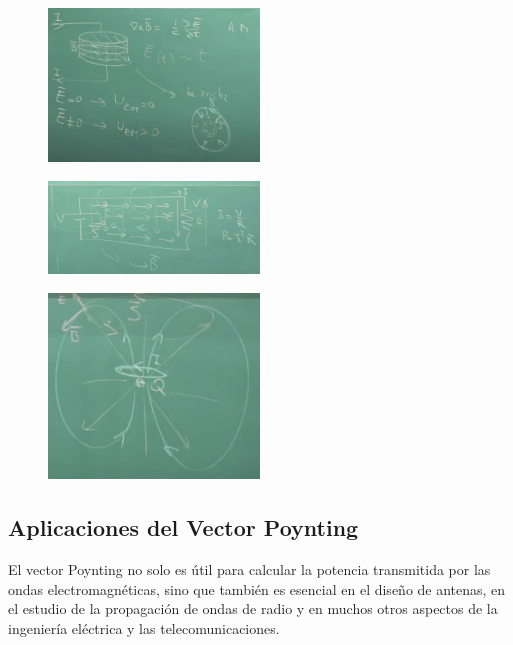 \documentclass{article}
\begin{document}
	\begin{figure}[h!]
		\centering
		\includegraphics[width=0.5\textwidth]{imagen3.jpg}
		\label{fig:mi_imagen4}
	\end{figure}
	\begin{figure}[h!]
		\centering
		\includegraphics[width=0.5\textwidth]{imagen4.jpg}
		\label{fig:mi_imagen5}
	\end{figure}
	\begin{figure}[h!]
		\centering
		\includegraphics[width=0.5\textwidth]{imagen5.jpg}
		\label{fig:mi_imagen6}
	\end{figure}
	
	\subsection{Aplicaciones del Vector Poynting}
	El vector Poynting no solo es útil para calcular la potencia transmitida por las ondas electromagnéticas, sino que también es esencial en el diseño de antenas, en el estudio de la propagación de ondas de radio y en muchos otros aspectos de la ingeniería eléctrica y las telecomunicaciones.
	
\end{document}
